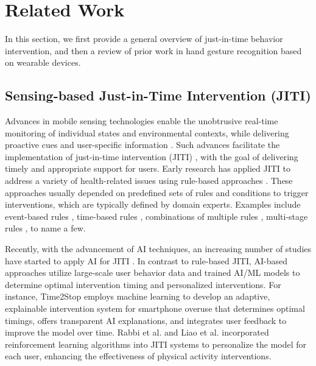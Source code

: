 \section{Related Work}
\label{sec:background}

In this section, we first provide a general overview of just-in-time behavior intervention, and then a review of prior work in hand gesture recognition based on wearable devices. 

\subsection{Sensing-based Just-in-Time Intervention (JITI)}

Advances in mobile sensing technologies enable the unobtrusive real-time monitoring of individual states and environmental contexts, while delivering proactive cues and user-specific information \cite{choi2019multi}.
Such advances facilitate the implementation of just-in-time intervention (JITI) \cite{nahum2018just}, with the goal of delivering timely and appropriate support for users.  
Early research has applied JITI to address a variety of health-related issues using rule-based approaches \cite{choi2019multi, sun2020beactive, haliburton2023exploring, luo2018time, kim2019lockntype, kim2019goalkeeper, howe2022design, raether2022evaluating, hsu2014persuasive}.
These approaches usually depended on predefined sets of rules and conditions to trigger interventions, which are typically defined by domain experts. Examples include event-based rules \cite{kim2019lockntype, kim2019goalkeeper, raether2022evaluating}, time-based rules \cite{sun2020beactive, haliburton2023exploring, luo2018time}, combinations of multiple rules \cite{howe2022design}, multi-stage rules \cite{choi2019multi}, to name a few. 

Recently, with the advancement of AI techniques, an increasing number of studies have started to apply AI for JITI \cite{orzikulova2024time2stop, wu2024mindshift, xu2022typeout, li2024stayfocused, sarker2014assessing, lee2017itchtector, liao2020personalized, kim2022prediction, rojas2021scalable, alharbi2023smokemon}. In contrast to rule-based JITI, AI-based approaches utilize large-scale user behavior data and trained AI/ML models to determine optimal intervention timing and personalized interventions.
For instance, Time2Stop \cite{orzikulova2024time2stop} employs machine learning to develop an adaptive, explainable intervention system for smartphone overuse that determines optimal timings, offers transparent AI explanations, and integrates user feedback to improve the model over time. Rabbi et al. \cite{rabbi2015mybehavior} and Liao et al. \cite{liao2020personalized} incorporated reinforcement learning algorithms into JITI systems to personalize the model for each user, enhancing the effectiveness of physical activity interventions.

